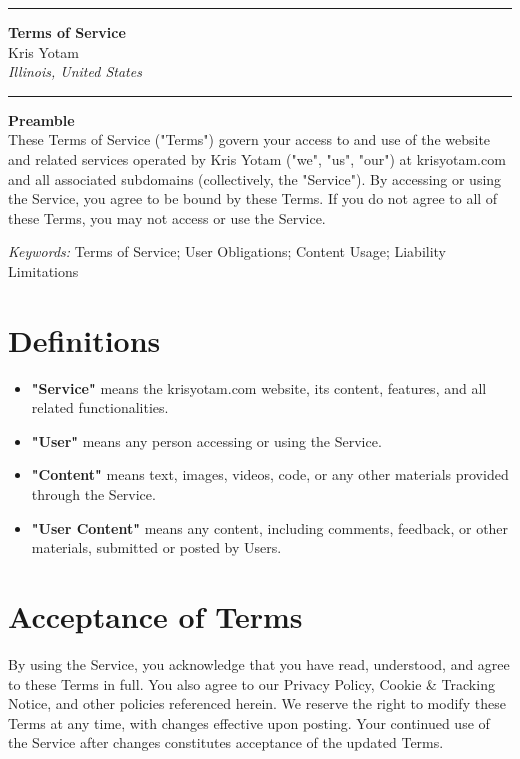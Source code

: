 \documentclass[11pt]{article}
\newcommand{\TitleLine}{\noindent\rule{\textwidth}{0.4pt}}
\begin{document}
\onehalfspacing

\vspace*{-1em}
\TitleLine
\vspace{0.5em}
\begin{center}
  {\Large\bfseries Terms of Service}\\[0.75em]
  {\normalsize Kris Yotam}\\
  {\itshape Illinois, United States}
\end{center}
\vspace{0.5em}
\TitleLine

\vspace{1.5em}

\noindent\textbf{Preamble}\\
These Terms of Service ("Terms") govern your access to and use of the website and related services operated by Kris Yotam ("we", "us", "our") at krisyotam.com and all associated subdomains (collectively, the "Service"). By accessing or using the Service, you agree to be bound by these Terms. If you do not agree to all of these Terms, you may not access or use the Service.

\vspace{0.75em}
\noindent\textit{Keywords:} Terms of Service; User Obligations; Content Usage; Liability Limitations

\vspace{1.5em}

\section{Definitions}
\begin{itemize}
  \item \textbf{"Service"} means the krisyotam.com website, its content, features, and all related functionalities.
  \item \textbf{"User"} means any person accessing or using the Service.
  \item \textbf{"Content"} means text, images, videos, code, or any other materials provided through the Service.
  \item \textbf{"User Content"} means any content, including comments, feedback, or other materials, submitted or posted by Users.
\end{itemize}

\section{Acceptance of Terms}
By using the Service, you acknowledge that you have read, understood, and agree to these Terms in full. You also agree to our Privacy Policy, Cookie \& Tracking Notice, and other policies referenced herein. We reserve the right to modify these Terms at any time, with changes effective upon posting. Your continued use of the Service after changes constitutes acceptance of the updated Terms.
\end{document}
